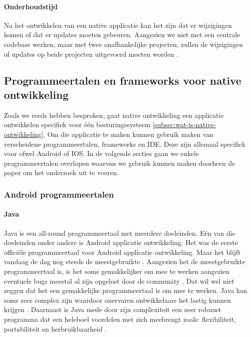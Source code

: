 \paragraph{Onderhoudstijd}
Na het ontwikkelen van een native applicatie kan het zijn dat er wijzigingen komen of 
dat er updates moeten gebeuren. Aangezien we niet met een centrale codebase werken, maar 
met twee onafhankelijke projecten, zullen de wijzigingen of updates op beide projecten 
uitgevoerd moeten worden \autocite{Kotlin2023}.

\subsection{Programmeertalen en frameworks voor native ontwikkeling}
Zoals we reeds hebben besproken, gaat native ontwikkeling een applicatie ontwikkelen 
specifiek voor één besturingssysteem \ref{subsec:wat-is-native-ontwikkeling}. Om die 
applicatie te maken kunnen gebruik maken van verscheidene programmeertalen, frameworks 
en \Gls{IDE}. Deze zijn allemaal specifiek voor ofwel Android of IOS. In de volgende 
secties gaan we enkele programmeertalen overlopen waarvan we gebruik kunnen maken doorheen 
de paper om het onderzoek uit te voeren.

\subsubsection{Android programmeertalen}
\paragraph{Java}
Java is een all-round programmeertaal met meerdere doeleinden. Eén van die doeleinden 
onder andere is Android applicatie ontwikkeling. Het was de eerste officiële programmeertaal 
voor Android applicatie ontwikkeling. Maar het blijft vandaag de dag nog steeds de 
meestgebruikte \autocite{harkiran2022}. Aangezien het de meestgebruikte programmeertaal 
is, is het soms gemakkelijker om mee te werken aangezien eventuele bugs meestal al zijn 
opgelost door de community \autocite{Thorndyke2021}. Dat wil wel niet zeggen dat het een 
gemakkelijke programmeertaal is om mee te werken. Java kan soms zeer complex zijn waardoor 
onervaren ontwikkelaars het lastig kunnen krijgen \autocite{Kesavan2021}. Daarnaast is Java 
mede door zijn complexiteit een zeer robuust programma dat een heleboel voordelen met zich 
meebrengt zoals: flexibiliteit, portabiliteit en herbruikbaarheid \autocite{Kesavan2021}.

